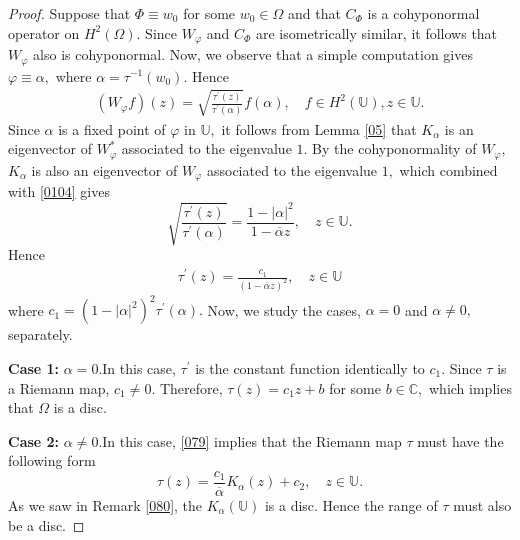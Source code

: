 \documentclass[11pt]{amsart}%
\theoremstyle{definition}
\theoremstyle{remark}
\numberwithin{equation}{section}
\begin{document}
\begin{proof}
Suppose that $\Phi\equiv w_{0}$ for some $w_{0}\in\Omega$ and that $C_{\Phi}$
is a cohyponormal operator on $H^{2}(\Omega).$
Since $W_{\varphi}$ and $C_{\Phi}$ are isometrically similar, it follows that
$W_{\varphi}$ also is cohyponormal. Now, we observe that a simple
computation gives $\varphi\equiv\alpha,$ where $\alpha=\tau^{-1}(w_{0}).$
Hence
\begin{align}\label{0104}
(W_{\varphi}f)(z)=\sqrt{\frac{\tau^{\prime}(z)}{\tau^{\prime}(\alpha)}%
}f(\alpha),\quad f\in H^{2}(\mathbb{U}),z\in\mathbb{U}.
\end{align}
Since $\alpha$ is a fixed point of $\varphi$ in $\mathbb{U},$ it follows from
Lemma \ref{05} that $K_{\alpha}$ is an eigenvector of $W_{\varphi}^*$ associated
to the eigenvalue $1.$ By the cohyponormality of $W_{\varphi},$ $K_{\alpha}$
is also an eigenvector of $W_{\varphi}$ associated to the eigenvalue $1,$
which combined with \eqref{0104} gives
\[
\sqrt{\frac{\tau^{\prime}(z)}{\tau^{\prime}(\alpha)}}=\frac{1-|\alpha|^{2}%
}{1-\overline{\alpha}z},\quad z\in\mathbb{U}.
\]
Hence
\begin{align}\label{079}
\tau^{\prime}(z)=\frac{c_{1}}{(1-\overline{\alpha}z)^{2}},\quad z\in\mathbb{U}%
\end{align}
where $c_{1}=(1-|\alpha|^{2})^{2}\tau^{\prime}(\alpha).$ Now, we study the
cases, $\alpha=0$ and $\alpha\neq0,$ separately.

\textbf{Case 1:} $\alpha=0.$\newline In this case, $\tau^{\prime}$ is the
constant function identically to $c_{1}.$ Since $\tau$ is a Riemann map,
$c_{1}\neq0.$ Therefore, $\tau(z)=c_{1}z+b$ for some $b\in\mathbb{C},$ which
implies that $\Omega$ is a disc.

\textbf{Case 2:} $\alpha\neq0.$\newline In this case, \eqref{079} implies that
the Riemann map $\tau$ must have the following form
\[
\tau(z)=\frac{c_{1}}{\overline{\alpha}}K_{\alpha}(z)+c_{2},\quad
z\in\mathbb{U}.
\]
As we saw in Remark \ref{080}, the $K_{\alpha}(\mathbb{U})$ is a disc. Hence
the range of $\tau$ must also be a disc.
\end{proof}
\end{document}
